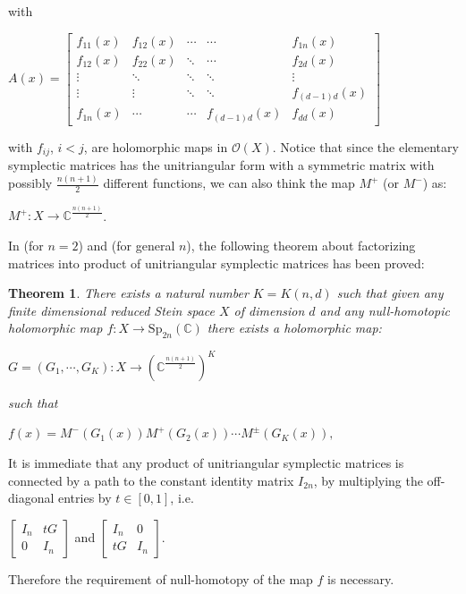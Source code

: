 \documentclass[10pt]{amsart}
\newtheorem{theo}{Theorem}[section]
\theoremstyle{remark}
\begin{document}
with 
\begin{center}
    $A(x) = \left[\begin{array}{ccccc} f_{11}(x) & f_{12}(x) & \cdots &\cdots &f_{1n}(x) \\  
    f_{12}(x) & f_{22}(x) & \ddots & \cdots & f_{2d}(x) \\
    \vdots & \ddots &\ddots &\ddots &\vdots \\
    \vdots & \vdots & \ddots &\ddots & f_{(d-1)d}(x) \\
    f_{1n}(x) & \cdots & \cdots &f_{(d-1)d}(x) & f_{dd}(x)\end{array}\right]$
\end{center}
with $f_{ij}$, $i<j$, are holomorphic maps in $\mathcal{O}(X)$. 
Notice that since the elementary symplectic matrices has the unitriangular form with a symmetric matrix with possibly $\frac{n(n+1)}{2}$ different functions, we can also think the map $M^{+}$ (or $M^-$) as: 
\begin{center}
    $M^+: X \to \mathbb{C}^{\frac{n(n+1)}{2}}$.
\end{center}
\fi
In \cite{IKL} (for $n=2$)  and \cite{Scho} (for general $n$), the following theorem about factorizing matrices into product of  unitriangular symplectic matrices  has been proved:

\begin{theo}\label{old-theo}
There exists a natural
number $K = K(n, d)$ such that given any finite dimensional reduced Stein space $X$ of dimension
$d$ and any null-homotopic holomorphic map $f : X \to \mathrm{Sp}_{2n}(\mathbb{C})$ there exists a holomorphic map:
\begin{center}
$G = (G_1, \cdots, G_K) : X \to (\mathbb{C}^{\frac{n(n+1)}{2}} )^K
$    
\end{center}
such that
\begin{center}
 $f(x) = M^-(G_1(x)) M^+(G_2(x)) 
 \cdots M^{\pm}(G_K(x)),$     
\end{center}
\end{theo}
It is immediate that any product of unitriangular symplectic matrices is connected by a path to the constant identity matrix $I_{2n}$, by multiplying the off-diagonal entries by $t \in [0, 1]$, i.e.
\begin{center}
    $\left[\begin{array}{ccc} I_n & tG \\ 0 & I_n\end{array}\right]$ and $\left[\begin{array}{ccc} I_n & 0 \\ tG & I_n\end{array}\right]$.
\end{center}
Therefore the requirement of null-homotopy of the map $f$ is necessary. 
\end{document}
